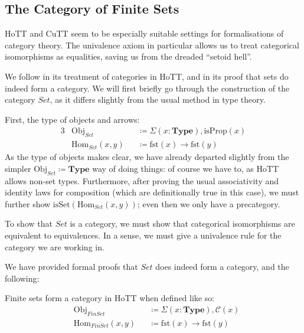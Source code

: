 \subsection{The Category of Finite Sets}
HoTT and CuTT seem to be especially suitable settings for formalisations of
category theory.
The univalence axiom in particular allows us to treat categorical isomorphisms
as equalities, saving us from the dreaded ``setoid hell''.

We follow \cite[chapter 9]{hottbook} in its treatment of
categories in HoTT, and in its proof that sets do indeed form a category.
We will first briefly go through the construction of the category
\(\mathit{Set}\), as it differs slightly from the usual method in type theory.

First, the type of objects and arrows:
\begin{alignat}{3}
  &\text{Obj}_\mathit{Set}      &&\coloneqq \Sigma(x : \mathbf{Type}) , \text{isProp}(x) \\
  &\text{Hom}_\mathit{Set}(x , y) &&\coloneqq  \text{fst}(x) \rightarrow \text{fst}(y)
\end{alignat}
As the type of objects makes clear, we have already departed slightly from the
simpler \(\text{Obj}_\mathit{Set} \coloneqq \mathbf{Type}\) way of doing things:
of course we have to, as HoTT allows non-set types.
Furthermore, after proving the usual associativity and identity laws for
composition (which are definitionally true in this case), we must further show
\(\text{isSet}(\text{Hom}_\mathit{Set}(x,y))\); even then we only have a
precategory.

To show that \(\mathit{Set}\) is a category, we must show that categorical
isomorphisms are equivalent to equivalences.
In a sense, we must give a univalence rule for the category we are working in.

We have provided formal proofs that \(\mathit{Set}\) does indeed form a
category, and the following:
\begin{romtheorem}
  Finite sets form a category in HoTT when defined like so:
  \begin{equation}
    \begin{aligned}
      &\text{Obj}_\mathit{FinSet}      &&\coloneqq \Sigma(x : \mathbf{Type}) , \mathcal{C}(x) \\
      &\text{Hom}_\mathit{FinSet}(x , y) &&\coloneqq  \text{fst}(x) \rightarrow \text{fst}(y)
    \end{aligned}
  \end{equation}
\end{romtheorem}
